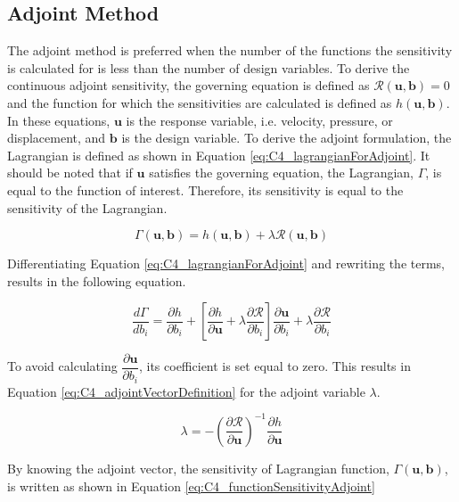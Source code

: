 \subsection{Adjoint Method}
The adjoint method is preferred when the number of the functions the sensitivity is calculated for is less than the number of design variables. To derive the continuous adjoint sensitivity, the governing equation is defined as $\mathcal{R}(\mathbf{u}, \mathbf{b}) = 0$ and the function for which the sensitivities are calculated is defined as $h(\mathbf{u}, \mathbf{b})$. In these equations, $\mathbf{u}$ is the response variable, i.e. velocity, pressure, or displacement, and $\mathbf{b}$ is the design variable. To derive the adjoint formulation, the Lagrangian is defined as shown in Equation \eqref{eq:C4_lagrangianForAdjoint}. It should be noted that if $\mathbf{u}$ satisfies the governing equation, the Lagrangian, $\Gamma$, is equal to the function of interest. Therefore, its sensitivity is equal to the sensitivity of the Lagrangian.

\begin{equation}\label{eq:C4_lagrangianForAdjoint}
    \Gamma(\mathbf{u}, \mathbf{b}) = h(\mathbf{u}, \mathbf{b}) + \lambda \mathcal{R}(\mathbf{u}, \mathbf{b})
\end{equation}

Differentiating Equation \eqref{eq:C4_lagrangianForAdjoint} and rewriting the terms, results in the following equation. 

\begin{equation}
    \frac{d \Gamma}{d b_i} = 
    \frac{\partial h}{\partial b_i} + 
    \left[ \frac{\partial h}{\partial \mathbf{u}} + \lambda \frac{\partial \mathcal{R}}{\partial b_i} \right]
    \frac{\partial \textbf{u}}{\partial b_i} + 
    \lambda \frac{\partial \mathcal{R}}{\partial b_i}
\end{equation}

To avoid calculating $\dfrac{\partial \textbf{u}}{\partial b_i}$, its coefficient is set equal to zero. This results in Equation \eqref{eq:C4_adjointVectorDefinition} for the adjoint variable $\lambda$.

\begin{equation}\label{eq:C4_adjointVectorDefinition}
    \lambda = -\left( \frac{\partial \mathcal{R}}{\partial \mathbf{u}} \right)^{-1} \frac{\partial h}{\partial \mathbf{u}}
\end{equation}

By knowing the adjoint vector, the sensitivity of Lagrangian function, $\Gamma(\mathbf{u}, \mathbf{b})$, is written as shown in Equation \eqref{eq:C4_functionSensitivityAdjoint}

